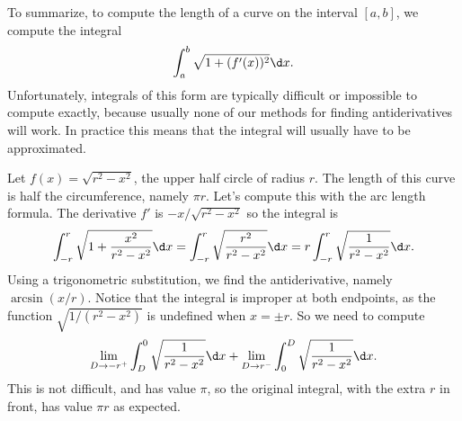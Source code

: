 To summarize, to compute the length of a curve on the interval
$[a,b]$, we compute the integral
$$\int_a^b \sqrt{1+(f'(x))^2}\d x.$$ 
Unfortunately, integrals of this form are typically difficult or
impossible to compute exactly, because usually none of our methods for
finding antiderivatives will work. In practice this means that the
integral will usually have to be approximated.


\begin{example} Let $f(x) = \sqrt{r^2-x^2}$, the upper half circle of radius
$r$. The length of this curve is half the circumference, namely $\pi
r$. Let's compute this with the arc length formula.
The derivative $f'$ is $-x/\sqrt{r^2-x^2}$ so the integral is
$$
  \int_{-r}^r \sqrt{1+{x^2\over r^2-x^2}}\d x
  =\int_{-r}^r \sqrt{r^2\over r^2-x^2}\d x
  =r\int_{-r}^r \sqrt{1\over r^2-x^2}\d x.
$$
Using a trigonometric substitution, we find the antiderivative, namely
$\arcsin(x/r)$. Notice that the integral is improper at both
endpoints, as the function $\sqrt{1/(r^2-x^2)}$ is undefined when
$x=\pm r$. So we need to compute
$$
  \lim_{D\to-r^+}\int_D^0  \sqrt{1\over r^2-x^2}\d x +
  \lim_{D\to r^-}\int_0^D  \sqrt{1\over r^2-x^2}\d x.
$$
This is not difficult, and has value $\pi$, so the original integral,
with the extra $r$ in front, has value $\pi r$ as expected.
\end{example}

